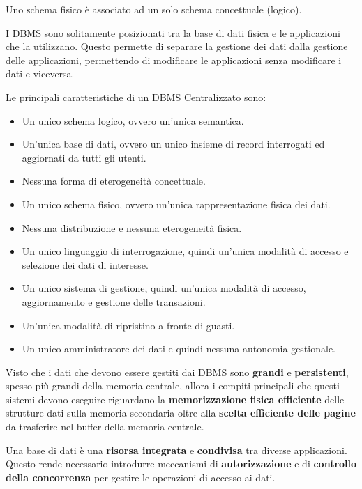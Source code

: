 \begin{nota}
      Uno schema fisico è associato ad un solo schema concettuale (logico).
\end{nota}
I DBMS sono solitamente posizionati tra la base di dati fisica e le applicazioni
che la utilizzano. Questo permette di separare la gestione dei dati dalla
gestione delle applicazioni, permettendo di modificare le applicazioni senza
modificare i dati e viceversa.

Le principali caratteristiche di un DBMS Centralizzato sono:
\begin{itemize}
      \item Un unico schema logico, ovvero un'unica semantica.
      \item Un'unica base di dati, ovvero un unico insieme di record interrogati
            ed aggiornati da tutti gli utenti.
      \item Nessuna forma di eterogeneità concettuale.
      \item Un unico schema fisico, ovvero un'unica rappresentazione fisica dei
            dati.
      \item Nessuna distribuzione e nessuna eterogeneità fisica.
      \item Un unico linguaggio di interrogazione, quindi un'unica modalità di
            accesso e selezione dei dati di interesse.
      \item Un unico sistema di gestione, quindi un'unica modalità di accesso,
            aggiornamento e gestione delle transazioni.
      \item Un'unica modalità di ripristino a fronte di guasti.
      \item Un unico amministratore dei dati e quindi nessuna autonomia gestionale.
\end{itemize}

Visto che i dati che devono essere gestiti dai DBMS sono \textbf{grandi} e
\textbf{persistenti}, spesso più grandi della memoria centrale, allora i compiti
principali che questi sistemi devono eseguire riguardano la \textbf{memorizzazione
      fisica efficiente} delle strutture dati sulla memoria secondaria oltre alla
\textbf{scelta efficiente delle pagine} da trasferire nel buffer della memoria
centrale.

Una base di dati è una \textbf{risorsa integrata} e \textbf{condivisa} tra diverse
applicazioni. Questo rende necessario introdurre meccanismi di \textbf{autorizzazione}
e di \textbf{controllo della concorrenza} per gestire le operazioni di accesso
ai dati.

